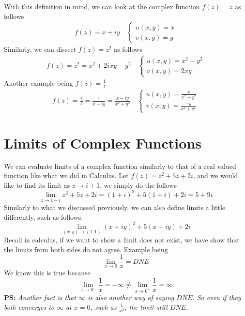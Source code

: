 \documentclass[12pt]{book}
\newcommand{\limto}[1]{\lim_{#1}}
\begin{document}
With this definition in mind, we can look at the complex function $f(z) = z$ as follows
\begin{align}
    f(z) = x+iy \quad \begin{cases}
        u(x,y) = x\\
        v(x,y) = y
    \end{cases}
\end{align}
Similarly, we can dissect $f(z) = z^2$ as follows
\begin{align}
    f(z) = z^2 = x^2 + 2ixy - y^2  \quad \begin{cases}
        u(x,y) = x^2-y^2\\
        v(x,y) = 2xy
    \end{cases}
\end{align}
Another example being $f(z) = \frac{1}{z}$
\begin{align}
    f(z) = \frac{1}{z} = \frac{1}{x+iy} = \frac{x-iy}{x^2+y^2} \quad \begin{cases}
        u(x,y) = \frac{x}{x^2+y^2}\\
        v(x,y) = \frac{-y}{x^2+y^2}
    \end{cases}
\end{align}

\section{Limits of Complex Functions}
We can evaluate limits of a complex function similarly to that of a real valued function like what we did in Calculus. Let $f(z) = z^2 + 5z + 2i$, and we would like to find its limit as $z \to i+1$, we simply do the follows
\[
\limto{z \to 1+i} z^2 + 5z + 2i = (1+i)^2 + 5(1+i) + 2i = 5+9i
\]
Similarly to what we discussed previously, we can also define limits a little differently, such as follows.
\[
\limto{(x,y) \to (1,1)} (x+iy)^2 + 5(x+iy) + 2i
\]
Recall in calculus, if we want to show a limit does not exist, we have show that the limits from both sides do not agree. Example being
\[
\limto{x \to 0} \frac{1}{x} = DNE
\]
We know this is true because
\[
\limto{x \to 0^-} \frac{1}{x} = -\infty \neq \limto{x \to 0^+} \frac{1}{x} = \infty
\]
\textbf{PS: }\textit{Another fact is that $\infty$ is also another way of saying $DNE$. So even if they both converges to $\infty$ at $x=0$, such as $\frac{1}{x^2}$, the limit still $DNE$.}
\end{document}
